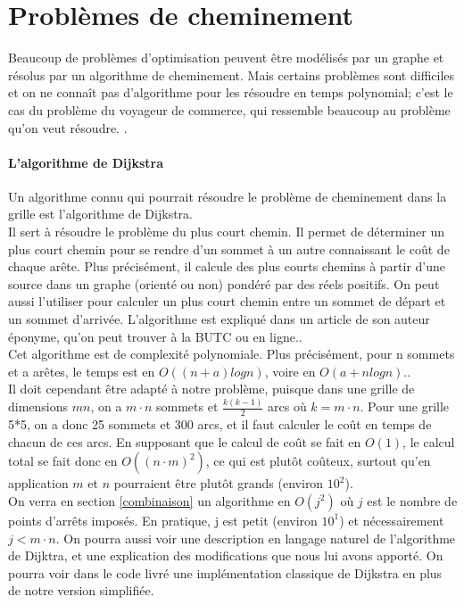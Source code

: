 \section{Problèmes de cheminement}
\label{cheminement}
Beaucoup de problèmes d'optimisation peuvent être modélisés par un graphe et résolus par un algorithme de cheminement. Mais certains problèmes sont difficiles et on ne connaît pas d'algorithme pour les résoudre en temps polynomial; c'est le cas du problème du voyageur de commerce, qui ressemble beaucoup au problème qu'on veut résoudre. \cite{wiki:voyageurCommerce}.
\paragraph{L'algorithme de Dijkstra}
Un algorithme connu qui pourrait résoudre le problème de cheminement dans la grille est l'algorithme de Dijkstra.\\

Il sert à résoudre le problème du plus court chemin. Il permet de déterminer un plus court chemin pour se rendre d'un sommet à un autre connaissant le coût de chaque arête. Plus précisément, il calcule des plus courts chemins à partir d'une source dans un graphe (orienté ou non) pondéré par des réels positifs. On peut aussi l'utiliser pour calculer un plus court chemin entre un sommet de départ et un sommet d'arrivée. L'algorithme est expliqué dans un article de son auteur éponyme, qu'on peut trouver à la BUTC ou en ligne.\cite{dijkstra}.\\

Cet algorithme est de complexité polynomiale. Plus précisément, pour n sommets et a arêtes, le temps est en $O((n+a) log n)$, voire en $O(a + n log n)$.\cite{wiki:dijkstra}.\\

Il doit cependant être adapté à notre problème, puisque dans une grille de dimensions $mn$, on a $m\cdot n$ sommets et $\frac{k(k-1)}{2}$ arcs où $k=m\cdot n$. Pour une grille 5*5, on a donc 25 sommets et 300 arcs, et il faut calculer le coût en temps de chacun de ces arcs. En supposant que le calcul de coût se fait en $O(1)$, le calcul total se fait donc en $O((n\cdot m)^2)$, ce qui est plutôt coûteux, surtout qu'en application $m$ et $n$ pourraient être plutôt grands (environ $10^2$).\\

On verra en section \ref{combinaison} un algorithme en $O(j^2)$ où $j$ est le nombre de points d'arrêts imposés. En pratique, j est petit (environ $10^1$) et nécessairement $j<m\cdot n$. On pourra aussi voir une description en langage naturel de l'algorithme de Dijktra, et une explication des modifications que nous lui avons apporté. On pourra voir dans le code livré une implémentation classique de Dijkstra en plus de notre version simplifiée.
